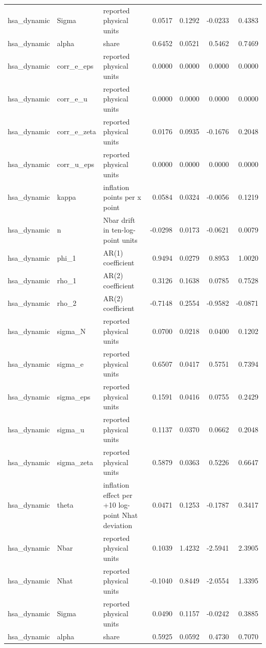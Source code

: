 \begin{tabular}{lllrrrr}
hsa\_dynamic & Sigma & reported physical units & 0.0517 & 0.1292 & -0.0233 & 0.4383 \\
hsa\_dynamic & alpha & share & 0.6452 & 0.0521 & 0.5462 & 0.7469 \\
hsa\_dynamic & corr\_e\_eps & reported physical units & 0.0000 & 0.0000 & 0.0000 & 0.0000 \\
hsa\_dynamic & corr\_e\_u & reported physical units & 0.0000 & 0.0000 & 0.0000 & 0.0000 \\
hsa\_dynamic & corr\_e\_zeta & reported physical units & 0.0176 & 0.0935 & -0.1676 & 0.2048 \\
hsa\_dynamic & corr\_u\_eps & reported physical units & 0.0000 & 0.0000 & 0.0000 & 0.0000 \\
hsa\_dynamic & kappa & inflation points per x point & 0.0584 & 0.0324 & -0.0056 & 0.1219 \\
hsa\_dynamic & n & Nbar drift in ten-log-point units & -0.0298 & 0.0173 & -0.0621 & 0.0079 \\
hsa\_dynamic & phi\_1 & AR(1) coefficient & 0.9494 & 0.0279 & 0.8953 & 1.0020 \\
hsa\_dynamic & rho\_1 & AR(2) coefficient & 0.3126 & 0.1638 & 0.0785 & 0.7528 \\
hsa\_dynamic & rho\_2 & AR(2) coefficient & -0.7148 & 0.2554 & -0.9582 & -0.0871 \\
hsa\_dynamic & sigma\_N & reported physical units & 0.0700 & 0.0218 & 0.0400 & 0.1202 \\
hsa\_dynamic & sigma\_e & reported physical units & 0.6507 & 0.0417 & 0.5751 & 0.7394 \\
hsa\_dynamic & sigma\_eps & reported physical units & 0.1591 & 0.0416 & 0.0755 & 0.2429 \\
hsa\_dynamic & sigma\_u & reported physical units & 0.1137 & 0.0370 & 0.0662 & 0.2048 \\
hsa\_dynamic & sigma\_zeta & reported physical units & 0.5879 & 0.0363 & 0.5226 & 0.6647 \\
hsa\_dynamic & theta & inflation effect per +10 log-point Nhat deviation & 0.0471 & 0.1253 & -0.1787 & 0.3417 \\
hsa\_dynamic & Nbar & reported physical units & 0.1039 & 1.4232 & -2.5941 & 2.3905 \\
hsa\_dynamic & Nhat & reported physical units & -0.1040 & 0.8449 & -2.0554 & 1.3395 \\
hsa\_dynamic & Sigma & reported physical units & 0.0490 & 0.1157 & -0.0242 & 0.3885 \\
hsa\_dynamic & alpha & share & 0.5925 & 0.0592 & 0.4730 & 0.7070 \\

\end{tabular}
